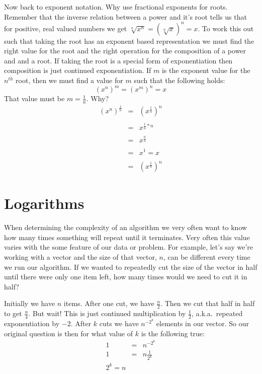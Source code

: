 \documentclass[nobib]{tufte-handout}
\begin{document}
Now back to exponent notation. Why use fractional exponents for roots.  Remember that the inverse relation between a power and it's root tells us that for positive, real valued numbers we get $\sqrt[n]{x^n}={(\sqrt[n]{x})}^n = x$. To work this out such that taking the root has an exponent based representation we must find the right value for the root and the right operation for the composition of a power and and a root. If taking the root is a special form of exponentiation then composition is just continued exponentiation. If $m$ is the exponent value for the $n^{th}$ root, then we must find a value for $m$ such that the following holds:
\begin{equation}
  {(x^n)}^m = {(x^m)}^n = x
\end{equation}
That value must be $m=\frac{1}{n}$. Why?
\begin{equation}
  \begin{array}{rcl}
      {(x^n)}^\frac{1}{n} &=& {(x^{\frac{1}{n}})}^n \\ \\
      &=& x^{\frac{1}{n}*n} \\ \\
      &=& x^{\frac{n}{n}} \\ \\
      &=& x^1 = x \\ \\
      &=& {(x^{\frac{1}{n}})}^n
  \end{array}
\end{equation}

\section{Logarithms}

When determining the complexity of an algorithm we very often want to know how many times something will repeat until it terminates. Very often this value varies with the some feature of our data or problem. For example, let's say we're working with a vector and the size of that vector, $n$, can be different every time we run our algorithm. If we wanted to repeatedly cut the size of the vector in half until there were only one item left, how many times would we need to cut it in half?

Initially we have $n$ items. After one cut, we have $\frac{n}{2}$. Then we cut that half in half to get $\frac{n}{4}$. But wait! This is just continued multiplication by $\frac{1}{2}$, a.k.a.\ repeated exponentiation by $-2$. After $k$ cuts we have $n^{-2^k}$ elements in our vector. So our original question is then for what value of $k$ is the following true:
\begin{equation*}
  \begin{array}{rcl}
      1 &=& n^{-2^k} \\
      1 &=& n\frac{1}{2^k} \\
      2^k = n
  \end{array}
\end{equation*}
\end{document}
